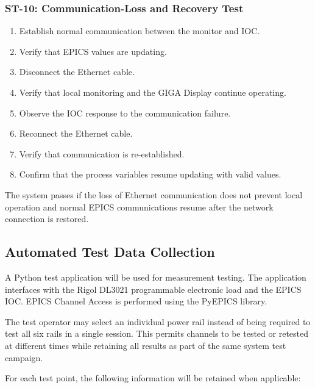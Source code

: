 \subsubsection{ST-10: Communication-Loss and Recovery Test}

\begin{enumerate}
    \item Establish normal communication between the monitor and IOC.
    \item Verify that EPICS values are updating.
    \item Disconnect the Ethernet cable.
    \item Verify that local monitoring and the GIGA Display continue operating.
    \item Observe the IOC response to the communication failure.
    \item Reconnect the Ethernet cable.
    \item Verify that communication is re-established.
    \item Confirm that the process variables resume updating with valid values.
\end{enumerate}

The system passes if the loss of Ethernet communication does not prevent local
operation and normal EPICS communications resume after the network connection is
restored.

\subsection{Automated Test Data Collection}

A Python test application will be used for measurement testing. The application
interfaces with the Rigol DL3021 programmable electronic load and the EPICS IOC.
EPICS Channel Access is performed using the PyEPICS library.

The test operator may select an individual power rail instead of being required to
test all six rails in a single session. This permits channels to be tested or
retested at different times while retaining all results as part of the same system
test campaign.

For each test point, the following information will be retained when applicable:

